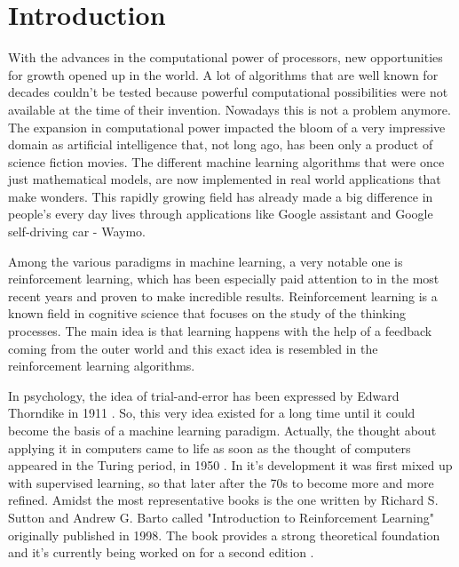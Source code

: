\chapter{Introduction}
With the advances in the computational power of processors, new opportunities for growth opened up in the world. A lot of algorithms that are well known for decades couldn't be tested because powerful computational possibilities were not available at the time of their invention. Nowadays this is not a problem anymore. The expansion in computational power impacted the bloom of a very impressive domain as artificial intelligence that, not long ago, has been only a product of science fiction movies. The different machine learning algorithms that were once just mathematical models, are now implemented in real world applications that make wonders. This rapidly growing field has already made a big difference in people's every day lives through applications like Google assistant and Google self-driving car - Waymo.

Among the various paradigms in machine learning, a very notable one is reinforcement learning, which has been especially paid attention to in the most recent years and proven to make incredible results. Reinforcement learning is a known field in cognitive science that focuses on the study of the thinking processes. The main idea is that learning happens with the help of a feedback coming from the outer world and this exact idea is resembled in the reinforcement learning algorithms. 

In psychology, the idea of trial-and-error has been expressed by Edward Thorndike in 1911 \cite{Sutton:1998:IRL:551283}. So, this very idea existed for a long time until it could become the basis of a machine learning paradigm. Actually, the thought about applying it in computers came to life as soon as the thought of computers appeared in the Turing period, in 1950 \cite{Sutton:1998:IRL:551283}. In it's development it was first mixed up with supervised learning, so that later after the 70s to become more and more refined. Amidst the most representative books is the one written by Richard S. Sutton and Andrew G. Barto called "Introduction to Reinforcement Learning" \cite{Sutton:1998:IRL:551283} originally published in 1998. The book \cite{Sutton:1998:IRL:551283} provides a strong theoretical foundation and it's currently being worked on for a second edition \cite{Sutton}.

